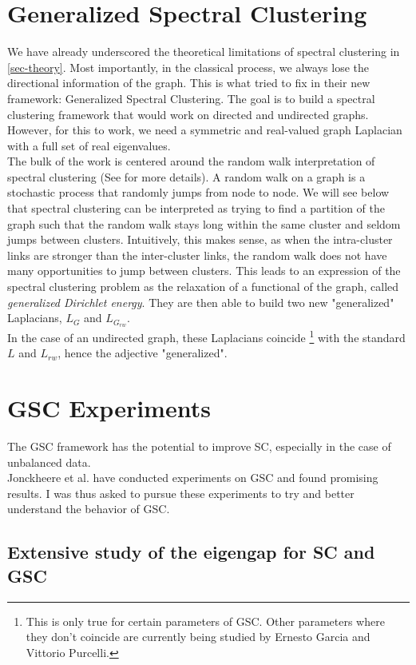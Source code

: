 \documentclass[a4paper,12pt]{article}
\theoremstyle{definition}
\theoremstyle{plain}
\begin{document}
\section{Generalized Spectral Clustering} \label{sec-gsc}
We have already underscored the theoretical limitations of spectral clustering in \ref{sec-theory}. Most importantly, in the classical process, we always lose the directional information of the graph. This is what \cite[Jonckheere et al.]{GSC} tried to fix in their new framework: Generalized Spectral Clustering. The goal is to build a spectral clustering framework that would work on directed and undirected graphs. However, for this to work, we need a symmetric and real-valued graph Laplacian with a full set of real eigenvalues.\\ The bulk of the work is centered around the random walk interpretation of spectral clustering (See \cite{tutorial} for more details). A random walk on a graph is a stochastic process that randomly jumps from node to node.
We will see below that spectral clustering can be interpreted as trying to find a partition of the graph
such that the random walk stays long within the same cluster and seldom jumps between clusters.
Intuitively, this makes sense, as when the intra-cluster links are stronger than the inter-cluster links, the random walk does not have
many opportunities to jump between clusters.
This leads to an expression of the spectral clustering problem as the relaxation of a functional of the graph, called \textit{generalized Dirichlet energy}. 
They are then able to build two new "generalized" Laplacians, $L_{G}$ and $L_{G_{rw}}$. \\
In the case of an undirected graph, these Laplacians coincide \footnote{This is only true for certain parameters of GSC. Other parameters where they don't coincide are currently being studied by Ernesto Garcia and Vittorio Purcelli.} with the standard $L$ and $L_{rw}$, hence the adjective "generalized". \\ 

\section{GSC Experiments}
The GSC framework has the potential to improve SC, especially in the case of unbalanced data.\\
Jonckheere et al. have conducted experiments on GSC and found promising results. I was thus asked to pursue these experiments to try and better understand the behavior of GSC.
\subsection{Extensive study of the eigengap for SC and GSC}
\end{document}
